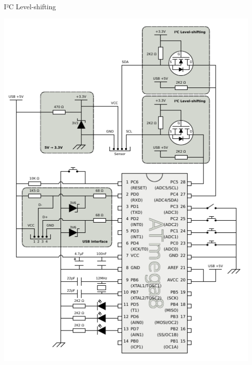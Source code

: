 \documentclass{beamer}
\begin{document}
\begin{frame}{I²C Level-shifting}
	\begin{center}
		\includegraphics[keepaspectratio, width=1.0\textwidth, height=0.8\textheight, clip, viewport=1.33in 2.66in 3.00in 3.66in]{../monografia/img/AVR-magnetometer-usb-mouse.pdf}
	\end{center}
\end{frame}
\end{document}
